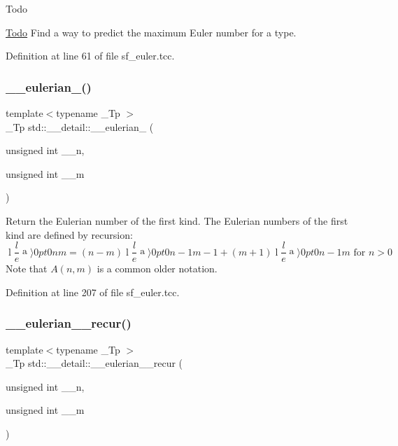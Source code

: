 \begin{DoxyRefDesc}{Todo}
\item[\hyperlink{todo__todo000008}{Todo}]Find a way to predict the maximum Euler number for a type. \end{DoxyRefDesc}


Definition at line 61 of file sf\+\_\+euler.\+tcc.

\mbox{\label{namespacestd_1_1____detail_a4556229d8792527574bfc6fa135908dd}} 
\subsubsection{\texorpdfstring{\+\_\+\+\_\+eulerian\+\_()}{\_\_eulerian\_1()}}
{\footnotesize\ttfamily template$<$typename \+\_\+\+Tp $>$ \\
\+\_\+\+Tp std\+::\+\_\+\+\_\+detail\+::\+\_\+\+\_\+eulerian\+\_ (\begin{DoxyParamCaption}\item[{unsigned int}]{\+\_\+\+\_\+n,  }\item[{unsigned int}]{\+\_\+\+\_\+m }\end{DoxyParamCaption})\hspace{0.3cm}{\ttfamily [inline]}}

Return the Eulerian number of the first kind. The Eulerian numbers of the first kind are defined by recursion\+: \[ \genfrac\langle\rangle{0pt}{0}{n}{m} = (n-m)\genfrac\langle\rangle{0pt}{0}{n-1}{m-1} + (m+1)\genfrac\langle\rangle{0pt}{0}{n-1}{m} \mbox{ for } n > 0 \] Note that $ A(n,m) $ is a common older notation. 

Definition at line 207 of file sf\+\_\+euler.\+tcc.

\mbox{\label{namespacestd_1_1____detail_afab99319465d188432fa8357d65129e0}} 
\subsubsection{\texorpdfstring{\+\_\+\+\_\+eulerian\+\_\+\_\+recur()}{\_\_eulerian\_1\_recur()}}
{\footnotesize\ttfamily template$<$typename \+\_\+\+Tp $>$ \\
\+\_\+\+Tp std\+::\+\_\+\+\_\+detail\+::\+\_\+\+\_\+eulerian\+\_\+\_\+recur (\begin{DoxyParamCaption}\item[{unsigned int}]{\+\_\+\+\_\+n,  }\item[{unsigned int}]{\+\_\+\+\_\+m }\end{DoxyParamCaption})}

